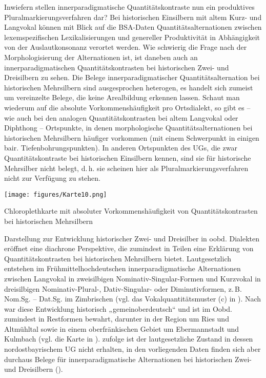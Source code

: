 Inwiefern stellen innerparadigmatische Quantitätskontraste nun ein produktives Pluralmarkierungsverfahren dar? Bei historischen Einsilbern mit altem Kurz- und Langvokal können mit Blick auf die BSA-Daten Quantitätsalternationen zwischen lexemspezifischen Lexikalisierungen und genereller Produktivität in Abhängigkeit von der Auslautkonsonanz verortet werden. Wie schwierig die Frage nach der Morphologisierung der Alternationen ist, ist daneben auch an innerparadigmatischen Quantitätskontrasten bei historischen Zwei- und Dreisilbern zu sehen. Die Belege innerparadigmatischer Quantitätsalternation bei historischen Mehrsilbern sind ausgesprochen heterogen, es handelt sich zumeist um vereinzelte Belege, die keine Arealbildung erkennen lassen. Schaut man wiederum auf die absolute Vorkommenshäufigkeit pro Ortsdialekt, so gibt es -- wie auch bei den analogen Quantitätskontrasten bei altem Langvokal oder Diphthong -- Ortspunkte, in denen morphologische Quantitätsalternationen bei historischen Mehrsilbern häufiger vorkommen (mit einem Schwerpunkt in einigen bair. Tiefenbohrungspunkten). In anderen Ortspunkten des UGs, die zwar Quantitätskontraste bei historischen Einsilbern kennen, sind sie für historische Mehrsilber nicht belegt, d.\,h. sie scheinen hier als Pluralmarkierungsverfahren nicht zur Verfügung zu stehen.


\begin{map}
\texttt{[image: figures/Karte10.png]}
\caption{Chloroplethkarte mit absoluter Vorkommenshäufigkeit von Quantitätskontrasten bei historischen Mehrsilbern}
\label{map:10}
\end{map}

 Darstellung zur Entwicklung historischer Zwei- und Dreisilber in oobd. Dialekten eröffnet eine diachrone Perspektive, die zumindest in Teilen eine Erklärung von Quantitätskontrasten bei historischen Mehrsilbern bietet. Lautgesetzlich entstehen im Frühmittelhochdeutschen innerparadigmatische Alternationen zwischen Langvokal in zwei\-silbigen Nominativ-Singular-Formen und Kurzvokal in dreisilbigen Nominativ-Plural-, Dativ-Singular- oder Diminutivformen, z.\,B. Nom.Sg.  -- Dat.Sg.  im Zimbrischen (vgl. das Vokalquantitätsmuster (c) in ). Nach \citet[82]{Kranzmayer1935} war diese Entwicklung historisch „gemeinoberdeutsch“ und ist im Oobd. zumindest in Restformen bewahrt, darunter in der Region um Ries und Altmühltal sowie in einem oberfränkischen Gebiet um Ebermannstadt und Kulmbach (vgl. die Karte in \citealt[67]{Kranzmayer1935}). \citet[73]{Rowley1997} zufolge ist der lautgesetzliche Zustand in dessen nordostbayrischem UG nicht erhalten, in den vorliegenden Daten finden sich aber durchaus Belege für innerparadigmatische Alternationen bei his\-to\-ri\-schen Zwei- und Dreisilbern ().\largerpage[-1]

